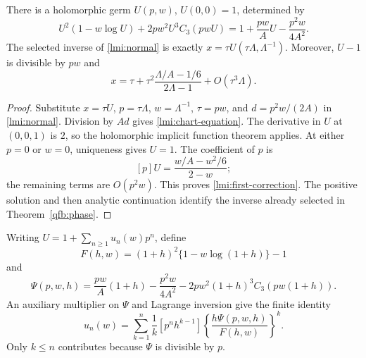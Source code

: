 \begin{theorem}\label{lmi:chart}
There is a holomorphic germ $U(p,w)$, $U(0,0)=1$, determined by
\begin{equation}\label{lmi:chart-equation}
 U^2(1-w\log U)+2pw^2U^3C_3(pwU)
 =1+\frac{pw}{A}U-\frac{p^2w}{4A^2}.
\end{equation}
The selected inverse of \eqref{lmi:normal} is exactly
$x=\tau U(\tau\Lambda,\Lambda^{-1})$. Moreover, $U-1$ is divisible
by $pw$ and
\begin{equation}\label{lmi:first-correction}
 x=\tau+\tau^2\frac{\Lambda/A-1/6}{2\Lambda-1}
       +O(\tau^3\Lambda).
\end{equation}
\end{theorem}
\begin{proof}
Substitute $x=\tau U$, $p=\tau\Lambda$, $w=\Lambda^{-1}$,
$\tau=pw$, and $d=p^2w/(2A)$ in \eqref{lmi:normal}.
Division by $Ad$ gives \eqref{lmi:chart-equation}.
The derivative in $U$ at $(0,0,1)$ is $2$, so the holomorphic
implicit function theorem applies. At either $p=0$ or $w=0$,
uniqueness gives $U=1$. The coefficient of $p$ is
\[
 [p]U=\frac{w/A-w^2/6}{2-w};
\]
the remaining terms are $O(p^2w)$. This proves
\eqref{lmi:first-correction}. The positive solution and then analytic
continuation identify the inverse already selected in Theorem~\ref{qfb:phase}.
\end{proof}

Writing $U=1+\sum_{n\ge1}u_n(w)p^n$, define
\[
 F(h,w)=(1+h)^2\{1-w\log(1+h)\}-1
\]
and
\[
 \Psi(p,w,h)=\frac{pw}{A}(1+h)-\frac{p^2w}{4A^2}
             -2pw^2(1+h)^3C_3(pw(1+h)).
\]
An auxiliary multiplier on $\Psi$ and Lagrange inversion give the finite
identity
\begin{equation}\label{lmi:finite}
 u_n(w)=\sum_{k=1}^n\frac1k[p^nh^{k-1}]
                 \left\{\frac{h\Psi(p,w,h)}{F(h,w)}\right\}^k.
\end{equation}
Only $k\le n$ contributes because $\Psi$ is divisible by $p$.

